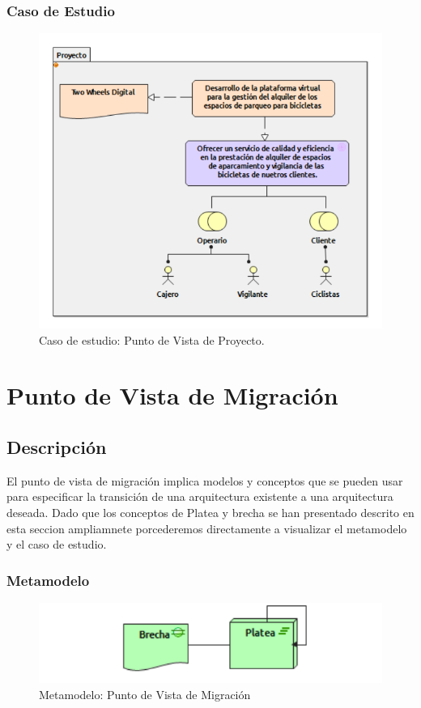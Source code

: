 \subsubsection{Caso de Estudio}


\begin{figure}[h]
	\centering
	\includegraphics[width=1.0\textwidth]{imagenes/Caso_Estudio/Migracion/Proyecto.PDF}
	\caption{Caso de estudio: Punto de Vista de Proyecto.}
	\label{fig:gap_analysis}
\end{figure}

\section{Punto de Vista de Migración}
\subsection{Descripción}
El punto de vista de migración implica modelos y conceptos que se pueden usar para especificar la transición de una arquitectura existente a una arquitectura deseada. Dado que los conceptos de Platea y brecha se han presentado descrito en esta seccion ampliamnete porcederemos directamente a visualizar el metamodelo y el caso de estudio.

\subsubsection{Metamodelo}
\begin{figure}[h]
	\centering
	\includegraphics[width=1.0\textwidth]{imagenes/Metamodelos/Migracion/meta_Migracion.pdf}
	\caption{Metamodelo: Punto de Vista de Migración}
	\label{fig:gap_analysis}
\end{figure}

